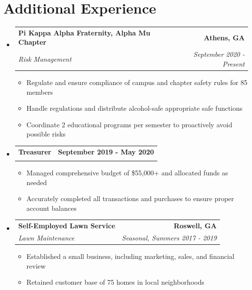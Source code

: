 \documentclass[letterpaper,11pt]{article}
\makeatletter
\newcommand{\resumeItem}[1]{
  \item\small{
    {#1 \vspace{-2pt}}
  }
}
\newcommand{\resumeSubheading}[4]{
  \vspace{-2pt}\item
    \begin{tabular*}{1.0\textwidth}[t]{l@{\extracolsep{\fill}}r}
      \textbf{#1} & \textbf{\small #2} \\
      \textit{\small#3} & \textit{\small #4} \\
    \end{tabular*}\vspace{-7pt}
}
\newcommand{\resumeSubHeadingListStart}{\begin{itemize}[leftmargin=0.0in, label={}]}
\newcommand{\resumeSubHeadingListEnd}{\end{itemize}}
\newcommand{\resumeItemListStart}{\begin{itemize}}
\newcommand{\resumeItemListEnd}{\end{itemize}\vspace{-5pt}}
\makeatother
\begin{document}
\section{Additional Experience}
  \resumeSubHeadingListStart

    \resumeSubheading
      {Pi Kappa Alpha Fraternity, Alpha Mu Chapter}{Athens, GA}
      {Risk Management}{September 2020 - Present}
      \resumeItemListStart
        \resumeItem{Regulate and ensure compliance of campus and chapter safety rules for 85 members}
        \resumeItem{Handle regulations and distribute alcohol-safe appropriate safe functions}
        \resumeItem{Coordinate 2 educational programs per semester to proactively avoid possible risks}
      \resumeItemListEnd

    \resumeSubheading
      {Treasurer}{September 2019 - May 2020}
      {}{}
      \resumeItemListStart
        \resumeItem{Managed comprehensive budget of \$55,000+ and allocated funds as needed}
        \resumeItem{Accurately completed all transactions and purchases to ensure proper account balances}
      \resumeItemListEnd

    \resumeSubheading
      {Self-Employed Lawn Service}{Roswell, GA}
      {Lawn Maintenance}{Seasonal, Summers 2017 - 2019}
      \resumeItemListStart
        \resumeItem{Established a small business, including marketing, sales, and financial review}
        \resumeItem{Retained customer base of 75 homes in local neighborhoods}
      \resumeItemListEnd

  \resumeSubHeadingListEnd
\end{document}
